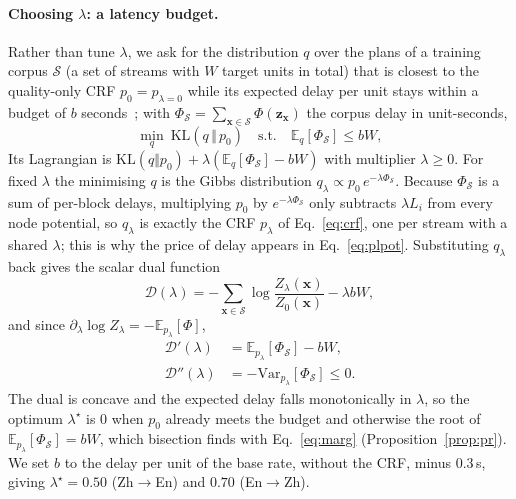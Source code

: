\paragraph{Choosing $\lambda$: a latency budget.} Rather than tune $\lambda$, we ask for the distribution $q$ over the
plans of a training corpus $\mathcal{S}$ (a set of streams with $W$ target units in total) that is closest to the
quality-only CRF $p_0=p_{\lambda=0}$ while its expected delay per unit stays within a budget of $b$
seconds~\citep{ganchev2010posterior}; with $\Phi_\mathcal{S}=\sum_{\bm{x}\in\mathcal{S}}\Phi(\bm{z}_{\bm{x}})$ the
corpus delay in unit-seconds,
\begin{equation}
\min_q\ \mathrm{KL}(q\,\Vert\,p_0)\quad\text{s.t.}\quad\mathbb{E}_q[\Phi_\mathcal{S}]\le bW,
\label{eq:pr}
\end{equation}
Its Lagrangian is $\mathrm{KL}(q\Vert p_0)+\lambda(\mathbb{E}_q[\Phi_\mathcal{S}]-bW)$ with multiplier $\lambda\ge0$. For
fixed $\lambda$ the minimising $q$ is the Gibbs distribution $q_\lambda\propto p_0\,e^{-\lambda\Phi_\mathcal{S}}$.
Because $\Phi_\mathcal{S}$ is a sum of per-block delays, multiplying $p_0$ by $e^{-\lambda\Phi_\mathcal{S}}$ only
subtracts $\lambda L_i$ from every node potential, so $q_\lambda$ is exactly the CRF $p_\lambda$ of Eq.~\eqref{eq:crf},
one per stream with a shared $\lambda$; this is why the price of delay appears in Eq.~\eqref{eq:plpot}. Substituting
$q_\lambda$ back gives the scalar dual function
\begin{equation}
\mathcal{D}(\lambda)=-\sum_{\bm{x}\in\mathcal{S}}\log\frac{Z_\lambda(\bm{x})}{Z_0(\bm{x})}-\lambda bW,
\label{eq:dual}
\end{equation}
and since $\partial_\lambda\log Z_\lambda=-\mathbb{E}_{p_\lambda}[\Phi]$,
\begin{equation}
\begin{aligned}
\mathcal{D}'(\lambda)&=\mathbb{E}_{p_\lambda}[\Phi_\mathcal{S}]-bW,\\
\mathcal{D}''(\lambda)&=-\mathrm{Var}_{p_\lambda}[\Phi_\mathcal{S}]\le0.
\end{aligned}
\label{eq:dualderiv}
\end{equation}
The dual is concave and the expected delay falls monotonically in $\lambda$, so the optimum $\lambda^\star$ is $0$ when
$p_0$ already meets the budget and otherwise the root of $\mathbb{E}_{p_\lambda}[\Phi_\mathcal{S}]=bW$, which bisection
finds with Eq.~\eqref{eq:marg} (Proposition~\ref{prop:pr}). We set $b$ to the delay per unit of the base rate, without
the CRF, minus 0.3\,s, giving $\lambda^\star=0.50$ (Zh$\rightarrow$En) and $0.70$ (En$\rightarrow$Zh).

